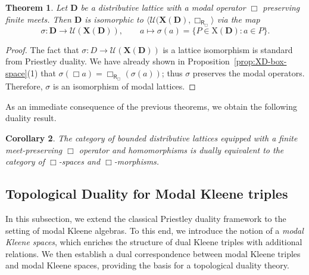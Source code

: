 \documentclass{article}
\newtheorem{theorem}{Theorem}[section]
\newtheorem{corollary}[theorem]{Corollary}
\DeclareMathOperator{\R}{\mathsf{R}}
\newcommand{\D}{\mathbf{D}}
\newcommand{\X}{\mathbf{X}}
\newcommand{\U}{\mathcal{U}}
\begin{document}
\begin{theorem}
\label{thm:sigma-box-iso}
Let $\D$ be a distributive lattice with a modal operator $\Box$ preserving finite meets. Then $\D$ is isomorphic to $\langle\U(\X(\D), \Box_{\R_\Box}\rangle$ via the map
\[
\sigma \colon \D \longrightarrow \U(\X(\D)), \qquad a \mapsto \sigma(a) = \{P \in \mathrm{X}(\D) : a \in P\}.
\]
\end{theorem}
\begin{proof}
The fact that $\sigma \colon D \to \U(\X(\D))$ is a lattice isomorphism is standard from Priestley duality. We have already shown in Proposition~\ref{prop:XD-box-space}(1) that $\sigma(\Box a) = \Box_{\R_\Box}(\sigma(a))$; thus $\sigma$ preserves the modal operators. Therefore, $\sigma$ is an isomorphism of modal lattices.
\end{proof}

As an immediate consequence of the previous theorems, we obtain the following duality result. 

\begin{corollary}
The category of bounded distributive lattices equipped with a finite meet-preserving $\Box$ operator and homomorphisms is dually equivalent to the category of $\Box$-spaces and $\Box$-morphisms.
\end{corollary} 

\subsection{Topological Duality for Modal Kleene triples}
\label{subsec:topological-duality-modal-kleene}

In this subsection, we extend the classical Priestley duality framework to the setting of modal Kleene algebras. To this end, we introduce the notion of a \emph{modal Kleene spaces}, which enriches the structure of dual Kleene triples with additional relations. We then establish a dual correspondence between modal Kleene triples and modal Kleene spaces, providing the basis for a topological duality theory.
\end{document}
